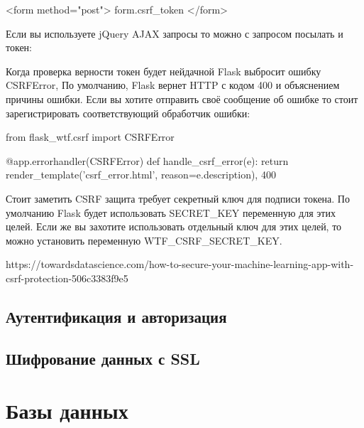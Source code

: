 \begin{python}
<form method="post">
    {{ form.csrf_token }}
</form>
\end{python}

Если вы используете jQuery AJAX запросы то можно с запросом посылать и
токен:


Когда проверка верности токен будет нейдачной Flask выбросит ошибку CSRFError, 
По умолчанию, Flask вернет HTTP с кодом 400 и объяснением причины ошибки. Если
вы хотите отправить своё сообщение об ошибке то стоит зарегистрировать соответствующий
обработчик ошибки:

\begin{python}
from flask_wtf.csrf import CSRFError

@app.errorhandler(CSRFError)
def handle_csrf_error(e):
    return render_template('csrf_error.html', reason=e.description), 400
\end{python}

Стоит заметить CSRF защита требует секретный ключ для подписи токена. По умолчанию Flask 
будет использовать SECRET\_KEY переменную для этих целей. Если же вы захотите использовать
отдельный ключ для этих целей, то можно установить переменную WTF\_CSRF\_SECRET\_KEY.

https://towardsdatascience.com/how-to-secure-your-machine-learning-app-with-csrf-protection-506c3383f9e5

\subsection{Аутентификация и авторизация}

\subsection{Шифрование данных с SSL}

\section{Базы данных}

